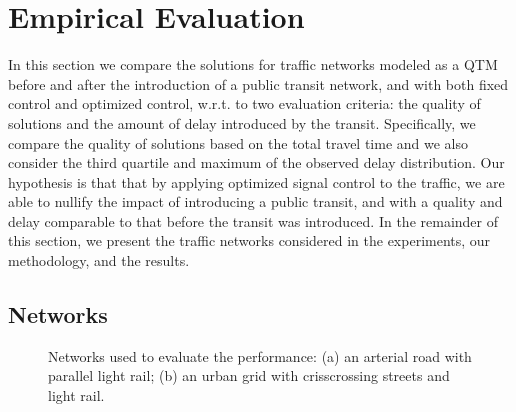 
\section{Empirical Evaluation}
  
In this section we compare the solutions for traffic networks modeled as a QTM
before and after the introduction of a public transit network, and with both fixed control
and optimized control, w.r.t. to two evaluation criteria:
the quality of solutions and the amount of delay introduced by the transit.
%
%
%
Specifically, we compare the quality of solutions based on the total travel time and we also
consider the third quartile and maximum of the observed delay distribution.
%
%
%
Our hypothesis is that that by applying optimized signal control to the traffic,
we are able to nullify the impact of introducing a public transit, and with a quality 
and delay comparable to that before the transit was introduced.
%
In the remainder of this section, we present the traffic networks considered in
the experiments, our methodology, and the results.



\subsection{Networks}



\begin{figure}[t!]
\centering
\caption{Networks used to evaluate the performance:
  (a) an arterial road with parallel light rail;
  (b) an urban grid with crisscrossing streets and light rail.
%
}
\label{fig:networks}
\end{figure}



